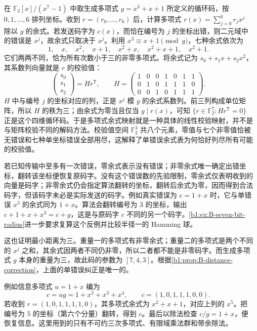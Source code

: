 \begin{example}\label{b1:exm:B-seven-bit-code}
	在 \(\mathbb F_2[x]/(x^7-1)\) 中取生成多项式 \(g=x^3+x+1\) 所定义的循环码，按 \(0,1,\ldots,6\) 排列坐标。收到 \(r=(r_0,\ldots,r_6)\) 后，计算多项式 \(r(x)=\sum_{j=0}^6r_jx^j\) 除以 \(g\) 的余式。若发送码字为 \(c(x)\)，而恰在编号为 \(j\) 的坐标出错，则二元域中的错误是 \(x^j\)，故余式只取决于 \(x^j\)。利用 \(x^3\equiv x+1\pmod g\)，七种余式依次为
	\[
		1,\quad x,\quad x^2,\quad x+1,\quad x^2+x,\quad x^2+x+1,\quad x^2+1.
	\]
	它们两两不同，恰为所有次数小于三的非零多项式。将余式记为 \(s_0+s_1x+s_2x^2\)，其系数列向量就是 \(r\) 的校验值：
	\[
		\begin{pmatrix}s_0\\s_1\\s_2\end{pmatrix}
		=Hr^{\mathsf T},\qquad
		H=\begin{pmatrix}
			1&0&0&1&0&1&1\\
			0&1&0&1&1&1&0\\
			0&0&1&0&1&1&1
		\end{pmatrix}.
	\]
	\(H\) 中与编号 \(j\) 的坐标对应的列，正是 \(x^j\) 模 \(g\) 的余式系数列。前三列构成单位矩阵，所以 \(H\) 的秩为三；由余式为零当且仅当 \(g\mid r(x)\)，可知 \(\{r\in\mathbb F_2^7:Hr^{\mathsf T}=0\}\) 正是这个四维循环码。于是多项式余式映射就是一种具体的线性校验映射，并不是与矩阵校验不同的解码方法。校验值空间 \(\mathbb F_2^3\) 共八个元素，零值与七个非零值恰被无错误和七种单坐标错误全部用尽，这解释了单错误余式表为何恰好列尽所有可能的校验值。

	\ProseParagraphBreak
	若已知传输中至多有一次错误，零余式表示没有错误；非零余式唯一确定出错坐标，翻转该坐标便恢复原码字。没有这个错误数的先验限制，零余式仅表明收到的向量是码字；非零余式仍会指定算法翻转的坐标，翻转后余式为零，因而得到合法码字，但该码字未必是实际发送的码字。例如真实错误为 \(e=1+x\) 时，它与单错误 \(x^3\) 的余式同为 \(1+x\)。算法会翻转编号为 \(3\) 的坐标，输出 \(c+1+x+x^3=c+g\)，这是与原码字 \(c\) 不同的另一个码字。\cref{b1:ex:B-seven-bit-radius}进一步要求复算这个反例并比较半径一的 Hamming 球。

	\ProseParagraphBreak
	这也证明最小距离为三。重量一的多项式有非零余式；重量二的多项式是两个不同的 \(x^j\) 之和，其余式因两者不同仍非零，所以二者都不能是非零码字。而生成多项式 \(g\) 本身的重量为三，故此码的参数为 \([7,4,3]\)。根据\cref{b1:prop:B-distance-correction}，上面的单错误纠正是唯一的。

	\ProseParagraphBreak
	例如信息多项式 \(u=1+x\) 编为
	\[
		c=ug=1+x^2+x^3+x^4, \qquad c=(1,0,1,1,1,0,0).
	\]
	若收到 \(r=(1,0,1,1,1,1,0)\)，其多项式余式为 \(x^2+x+1\)，对应上列的 \(x^5\)。把编号为 \(5\) 的坐标（第六个分量）翻转，得到 \(c\)。最后以除法检查 \(c/g=1+x\)，便恢复信息。这里用到的只有不可约三次多项式、有限域乘法群和带余除法。
\end{example}
